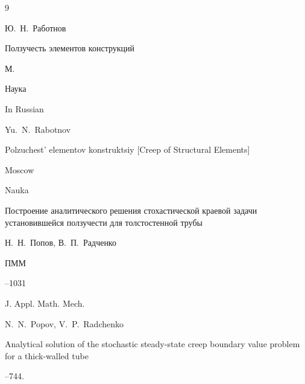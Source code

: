 \begin{thebibliography}{9}




\by Ю.~Н.~Работнов 

\book Ползучесть элементов конструкций 

\publaddr М. 

\publ Наука 



\misctransl

\lang In Russian

\by Yu.~N.~Rabotnov

\book Polzuchest' elementov konstruktsiy \rm [Creep of Structural Elements]

\publaddr Moscow

\publ Nauka










\paper Построение аналитического решения стохастической краевой задачи установившейся ползучести для толстостенной трубы 

\by Н.~Н.~Попов, В.~П.~Радченко  

\jour ПММ 




--1031

\transl

\jour J. Appl. Math. Mech.

\by N.~N.~Popov, V.~P.~Radchenko

\paper Analytical solution of the stochastic steady-state creep boundary value problem for a thick-walled tube




--744.











\end{thebibliography}
